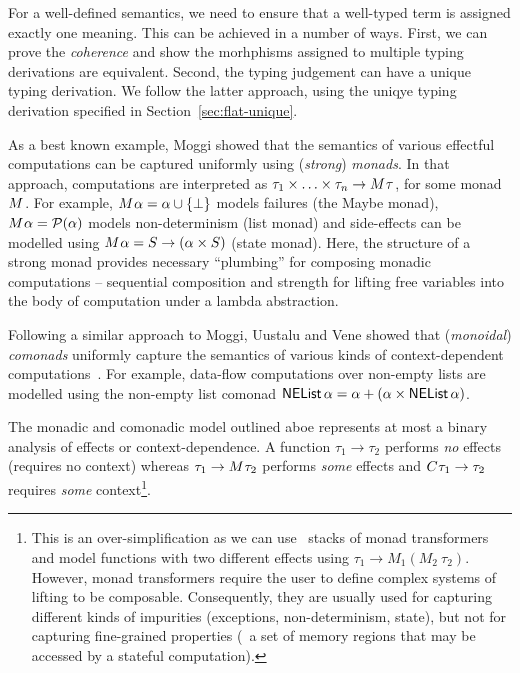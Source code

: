 For a well-defined semantics, we need to ensure that a well-typed term is assigned exactly one
meaning. This can be achieved in a number of ways. First, we can prove the \emph{coherence}
\cite{semantics-bltres} and show the morhphisms assigned to multiple typing derivations are equivalent.
Second, the typing judgement can have a unique typing derivation. We follow the latter approach,
using the uniqye typing derivation specified in Section~\ref{sec:flat-unique}.

As a best known example, Moggi \cite{monad-notions} showed that the semantics of various effectful
computations can be captured uniformly using (\emph{strong}) \emph{monads}. In that
approach, computations are interpreted as $\tau_1 \times \ldots \times \tau_n \rightarrow M^{}\tau$,
for some monad $M^{}$. For example, $M^{}\alpha = \alpha \cup \{ \bot \}$ models
failures (the Maybe monad), $M^{}\alpha = \mathcal{P}(\alpha)$ models non-determinism (list
monad) and side-effects can be modelled using $M^{}\alpha = S \rightarrow (\alpha \times S)$
(state monad). Here, the structure of a strong monad provides necessary ``plumbing'' for composing
monadic computations -- sequential composition and strength for lifting free variables into the
body of computation under a lambda abstraction.

Following a similar approach to Moggi, Uustalu and Vene \cite{comonads-notions} showed that
(\emph{monoidal}) \emph{comonads} uniformly capture the semantics of various kinds of context-dependent
computations~\cite{comonads-notions}. For example, data-flow computations over non-empty lists
are modelled using the non-empty list comonad $\ident{NEList}\,\alpha = \alpha + (\alpha \times \ident{NEList}\,\alpha)$.

The monadic and comonadic model outlined aboe represents at most a binary analysis of effects or
context-dependence. A function $\tau_1 \rightarrow \tau_2$ performs \emph{no} effects (requires no
context) whereas $\tau_1 \rightarrow M^{}\tau_2$ performs \emph{some} effects and
$C^{}\tau_1 \rightarrow \tau_2$ requires \emph{some} context\footnote{This is an
over-simplification as we can use \eg~stacks of monad transformers and model functions with
two different effects using $\tau_1 \rightarrow M_1(M_2~\tau_2)$. However, monad transformers
require the user to define complex systems of lifting to be composable. Consequently, they are usually used
for capturing different kinds of impurities (exceptions, non-determinism, state), but not for
capturing fine-grained properties (\eg~a set of memory regions that may be accessed by a
stateful computation).}.

